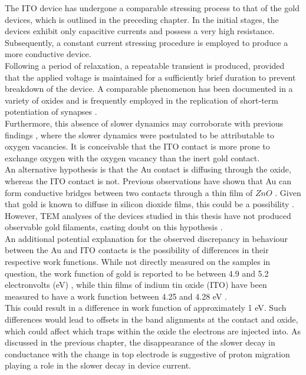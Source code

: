 \noindent The ITO device has undergone a comparable stressing process to that of the gold devices, which is outlined in the preceding chapter. In the initial stages, the devices exhibit only capacitive currents and possess a very high resistance. Subsequently, a constant current stressing procedure is employed to produce a more conductive device. \\

\noindent Following a period of relaxation, a repeatable transient is produced, provided that the applied voltage is maintained for a sufficiently brief duration to prevent breakdown of the device. A comparable phenomenon has been documented \cite{moon2019rram} in a variety of oxides and is frequently employed in the replication of short-term potentiation of synapses \cite{zhang2017emulating, chang2011short}.\\

\noindent Furthermore, this absence of slower dynamics may corroborate with previous findings \cite{meyer2005oxygen}, where the slower dynamics were postulated to be attributable to oxygen vacancies. It is conceivable that the ITO contact is more prone to exchange oxygen with the oxygen vacancy than the inert gold contact. \\

\noindent An alternative hypothesis is that the Au contact is diffusing through the oxide, whereas the ITO contact is not. Previous observations have shown that Au can form conductive bridges between two contacts through a thin film of $ZnO$ \cite{peng2012resistive}. Given that gold is known to diffuse in silicon dioxide films, this could be a possibility \cite{madams1974migration}. However, TEM analyses of the devices studied in this thesis have not produced observable gold filaments, casting doubt on this hypothesis \cite{mehonic2017intrinsic}.\\

\noindent An additional potential explanation for the observed discrepancy in behaviour between the Au and ITO contacts is the possibility of differences in their respective work functions. While not directly measured on the samples in question, the work function of gold is reported to be between 4.9 and 5.2 electronvolts (eV) \cite{tran2019anisotropic}, while thin films of indium tin oxide (ITO) have been measured to have a work function between 4.25 and 4.28 eV \cite{schlaf2001work}. \\

\noindent This could result in a difference in work function of approximately 1 eV. Such differences would lead to offsets in the band alignments at the contact and oxide, which could affect which traps within the oxide the electrons are injected into. As discussed in the previous chapter, the disappearance of the slower decay in conductance with the change in top electrode is suggestive of proton migration playing a role in the slower decay in device current.

